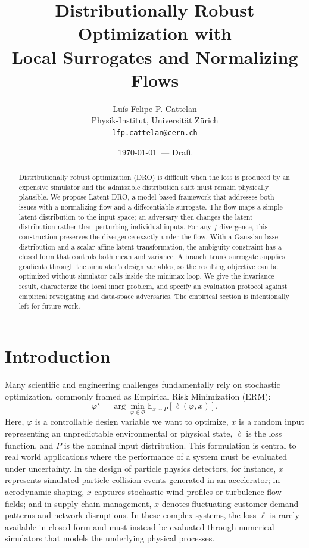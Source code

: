 \documentclass[11pt]{article}
\title{Distributionally Robust Optimization with\\
 Local Surrogates and Normalizing Flows}
\author{Luís Felipe P. Cattelan \\
\small Physik-Institut, Universit\"at Z\"urich \\
\small \texttt{lfp.cattelan@cern.ch}}
\date{\today\ --- Draft}
\newcommand{\E}{\mathbb{E}}
\newcommand{\Phibox}{\Phi}
\newcommand{\design}{\varphi}
\begin{document}
\maketitle

\begin{abstract}
Distributionally robust optimization (DRO) is difficult when the loss is produced by an
expensive simulator and the admissible distribution shift must remain physically plausible.
We propose Latent-DRO, a model-based framework that addresses both issues with a normalizing
flow and a differentiable surrogate. The flow maps a simple latent distribution to the input
space; an adversary then changes the latent distribution rather than perturbing individual
inputs. For any $f$-divergence, this construction preserves the divergence exactly under the
flow. With a Gaussian base distribution and a scalar affine latent transformation, the
ambiguity constraint has a closed form that controls both mean and variance. A branch--trunk surrogate supplies gradients through the
simulator's design variables, so the resulting objective can be optimized without simulator
calls inside the minimax loop. We give the invariance result, characterize the local inner
problem, and specify an evaluation protocol against empirical reweighting and data-space
adversaries. The empirical section is intentionally left for future work.
\end{abstract}

\section{Introduction}

Many scientific and engineering challenges fundamentally rely on stochastic optimization, commonly framed as Empirical Risk Minimization (ERM):
\begin{equation}
  \label{eq:erm}
  \design^\star = \arg\min_{\design \in \Phibox}
  \E_{x \sim P}[\ell(\design,x)].
\end{equation}
Here, $\design$ is a controllable design variable we want to optimize, $x$ is a random input representing an unpredictable environmental or physical state, $\ell$ is the loss function, and $P$ is the nominal input distribution. This formulation is central to real world applications where the performance of a system must be evaluated under uncertainty. In the design of particle physics detectors, for instance, $x$ represents simulated particle collision events generated in an accelerator; in aerodynamic shaping, $x$ captures stochastic wind profiles or turbulence flow fields; and in supply chain management, $x$ denotes fluctuating customer demand patterns and network disruptions. In these complex systems, the loss $\ell$ is rarely available in closed form and must instead be evaluated through numerical simulators that models the underlying physical processes.
\end{document}
